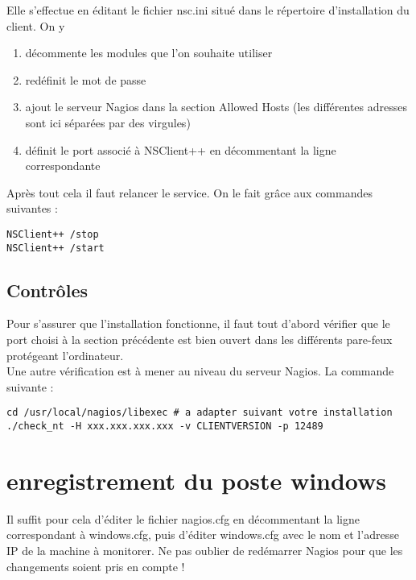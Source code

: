 Elle s'effectue en éditant le fichier nsc.ini situé dans le répertoire
d'installation du client. On y

\begin{enumerate}
\item décommente les modules que l'on souhaite utiliser
\item redéfinit le mot de passe
\item ajout le serveur Nagios dans la section Allowed Hosts (les
différentes adresses sont ici séparées par des virgules)
\item définit le port associé à NSClient++ en décommentant la ligne
correspondante
\end{enumerate}

Après tout cela il faut relancer le service. On le fait grâce aux commandes
suivantes :

\begin{verbatim}
NSClient++ /stop
NSClient++ /start
\end{verbatim}

\subsection{Contrôles}

Pour s'assurer que l'installation fonctionne, il faut tout d'abord vérifier
que le port choisi à la section précédente est bien ouvert dans les
différents pare-feux protégeant l'ordinateur.\\
Une autre vérification est à mener au niveau du serveur Nagios. La commande
suivante :

\begin{verbatim}
cd /usr/local/nagios/libexec # a adapter suivant votre installation
./check_nt -H xxx.xxx.xxx.xxx -v CLIENTVERSION -p 12489
\end{verbatim}

\section{enregistrement du poste windows}

Il suffit pour cela d'éditer le fichier nagios.cfg en décommentant la ligne
correspondant à windows.cfg, puis d'éditer windows.cfg avec le nom et
l'adresse IP de la machine à monitorer. Ne pas oublier de redémarrer Nagios
pour que les changements soient pris en compte !
